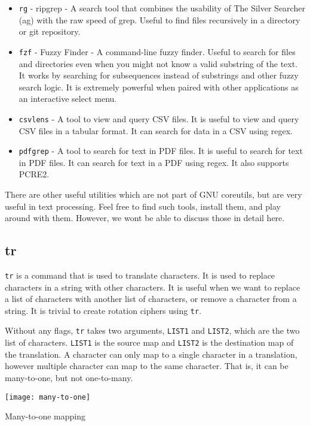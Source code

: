 \begin{itemize}
  \item \lstinline|rg| - ripgrep - A search tool that combines the usability of The Silver Searcher (ag) with the raw speed of grep. Useful to find files recursively in a directory or git repository.
  \item \lstinline|fzf| - Fuzzy Finder - A command-line fuzzy finder. Useful to search for files and directories even when you might not know a valid substring of the text. It works by searching for subsequences instead of substrings and other fuzzy search logic. It is extremely powerful when paired with other applications as an interactive select menu.
  \item \lstinline|csvlens| - A tool to view and query CSV files. It is useful to view and query CSV files in a tabular format. It can search for data in a CSV using regex.
  \item \lstinline|pdfgrep| - A tool to search for text in PDF files. It is useful to search for text in PDF files. It can search for text in a PDF using regex. It also supports PCRE2.
\end{itemize}

There are other useful utilities which are not part of GNU coreutils, but are very useful in text processing. Feel free to find such tools, install them, and play around with them. However, we wont be able to discuss those in detail here.

\subsection{tr}

\lstinline|tr| is a command that is used to translate characters. It is used to replace characters in a string with other characters. It is useful when we want to replace a list of characters with another list of characters, or remove a character from a string. It is trivial to create rotation ciphers using \lstinline|tr|.

Without any flags, \lstinline|tr| takes two arguments, \lstinline|LIST1| and \lstinline|LIST2|, which are the two list of characters. \lstinline|LIST1| is the source map and \lstinline|LIST2| is the destination map of the translation. A character can only map to a single character in a translation, however multiple character can map to the same character. That is, it can be many-to-one, but not one-to-many.

\begin{marginfigure}
  \texttt{[image: many-to-one]}
  \caption{Many-to-one mapping}
\end{marginfigure}

